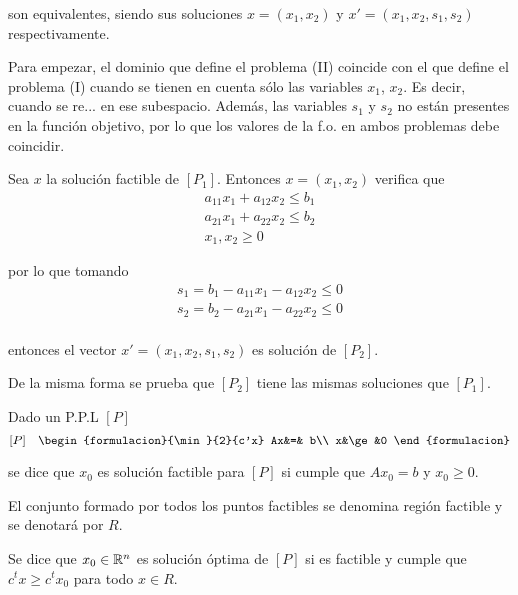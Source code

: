 son equivalentes, siendo sus soluciones $x=(x_1,x_2)$ y $x'=(x_1,x_2,s_1,s_2)$ respectivamente.

Para empezar, el dominio que define el problema ({\sc II}) coincide con el que define el problema ({\sc I}) cuando se tienen en cuenta sólo las variables $x_1$, $x_2$. Es decir, cuando se re... en ese subespacio. Además, las variables $s_1$ y $s_2$ no están presentes en la función objetivo, por lo que los valores de la f.o. en ambos problemas debe coincidir.

Sea $x$ la solución factible de $[P_1]$. Entonces $x=(x_1,x_2)$ verifica que 
$$
\begin{array}{c}
    a_{11}x_1 +a_{12}x_2 \le b_1\\
    a_{21}x_1 +a_{22}x_2 \le b_2\\
    x_1,x_2\ge 0
\end{array}
$$

por lo que tomando
$$
\begin{array}{c}
  s_1=b_1-a_{11}x_1 -a_{12}x_2 \le 0\\
  s_2=b_2-a_{21}x_1 -a_{22}x_2 \le 0\\
\end{array}
$$

entonces el vector $x'=(x_1,x_2,s_1,s_2)$ es solución de $[P_2]$.

De la misma forma se prueba que $[P_2]$ tiene las mismas soluciones que $[P_1]$.

\begin{definicion}
  Dado un P.P.L $[P]$
  $$[P] \quad
  \begin{formulacion}{\min}{2}{c'x}
    Ax&=& b\\	
    x&\ge&0
  \end{formulacion}$$
  
  se dice que $x_0$ es solución factible para $[P]$ si cumple que $Ax_0=b$ y $x_0\ge0$.
\end{definicion}


\begin{definicion}
  El conjunto formado por todos los puntos factibles se denomina región factible y se denotará por $R$.
\end{definicion}

\begin{definicion}
  Se dice que $x_0\in \mathbb R^n$ es solución óptima de $[P]$ si es factible y cumple que $c^tx\ge c^tx_0$ para todo $x\in R$.
\end{definicion}

